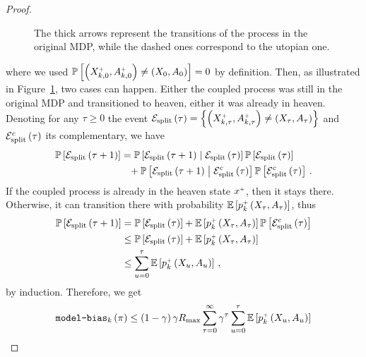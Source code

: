 \begin{proof}
\begin{figure}
\begin{center}
        \end{center}
        \caption{The thick arrows represent the transitions of the process in the original MDP, while the dashed ones correspond to the utopian one.}
        \label{fig:bias-term}
    \end{figure}
    \hspace{-4.5pt}where we used $\mathbb{P} \left[ \left( X^{\mathsf{\scriptscriptstyle +}}_{k, 0}, A^{\mathsf{\scriptscriptstyle +}}_{k, 0} \right) \neq \left( X_0, A_0 \right) \right] = 0$ by definition. Then, as illustrated in Figure~\ref{fig:bias-term}, two cases can happen. Either the coupled process was still in the original MDP and transitioned to heaven, either it was already in heaven. Denoting for any $\tau \geq 0$ the event $\mathcal{E}_\mathrm{split} \left( \tau \right) = \left\{ \left( X^{\mathsf{\scriptscriptstyle +}}_{k, \tau}, A^{\mathsf{\scriptscriptstyle +}}_{k, \tau} \right) \neq \left( X_\tau, A_\tau \right) \right\}$ and $\mathcal{E}^c_\mathrm{split} \left( \tau \right)$ its complementary, we have
    \begin{align*}
        \mathbb{P} \left[ \mathcal{E}_\mathrm{split} \left( \tau+1 \right) \right] &= \mathbb{P} \left[ \mathcal{E}_\mathrm{split} \left( \tau+1 \right) \mathrel{}\middle|\mathrel{} \mathcal{E}_\mathrm{split} \left( \tau \right) \right] \mathbb{P} \left[ \mathcal{E}_\mathrm{split} \left( \tau \right) \right] \\
        &\phantom{=}+ \mathbb{P} \left[ \mathcal{E}_\mathrm{split} \left( \tau+1 \right) \mathrel{}\middle|\mathrel{} \mathcal{E}^c_\mathrm{split} \left( \tau \right) \right] \mathbb{P} \left[ \mathcal{E}^c_\mathrm{split} \left( \tau \right) \right]\,.
    \end{align*}
    If the coupled process is already in the heaven state $x^{\mathsf{\scriptscriptstyle +}}$, then it stays there. Otherwise, it can transition there with probability $\mathbb{E} \left[ p_k^{\mathsf{\scriptscriptstyle +}} \left( X_\tau, A_\tau \right) \right]$, thus
    \begin{align*}
        \mathbb{P} \left[ \mathcal{E}_\mathrm{split} \left( \tau+1 \right) \right] &= \mathbb{P} \left[ \mathcal{E}_\mathrm{split} \left( \tau \right) \right] + \mathbb{E} \left[ p_k^{\mathsf{\scriptscriptstyle +}} \left( X_\tau, A_\tau \right) \right] \mathbb{P} \left[ \mathcal{E}^c_\mathrm{split} \left( \tau \right) \right] \\
        &\leq \mathbb{P} \left[ \mathcal{E}_\mathrm{split} \left( \tau \right) \right] + \mathbb{E} \left[ p_k^{\mathsf{\scriptscriptstyle +}} \left( X_\tau, A_\tau \right) \right] \\
        &\leq \sum_{u=0}^\tau \mathbb{E} \left[ p_k^{\mathsf{\scriptscriptstyle +}} \left( X_u, A_u \right) \right]\,,
    \end{align*}
    by induction. Therefore, we get
    \begin{align*}
        \modelbias_k \spr{\pi} &\leq \spr{1 - \gamma} \gamma \RMAX \sum_{\tau=0}^\infty \gamma^\tau \sum_{u=0}^\tau \bbE \sbr{p_k^\upplus \spr{X_u, A_u}} \\

\end{align*}
\end{proof}
